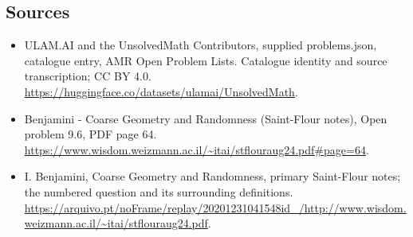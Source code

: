 \documentclass[11pt,a4paper]{article}
\begin{document}
\subsection{Sources}
\begin{itemize}
\item[S1] ULAM.AI and the UnsolvedMath Contributors, supplied problems.json, catalogue entry, AMR Open Problem Lists. Catalogue identity and source transcription; CC BY 4.0.
\url{https://huggingface.co/datasets/ulamai/UnsolvedMath}.
\item[S2] Benjamini - Coarse Geometry and Randomness (Saint-Flour notes), Open problem 9.6, PDF page 64. 
\url{https://www.wisdom.weizmann.ac.il/~itai/stflouraug24.pdf#page=64}.
\item[S3] I. Benjamini, Coarse Geometry and Randomness, primary Saint-Flour notes; the numbered question and its surrounding definitions.
\url{https://arquivo.pt/noFrame/replay/20201231041548id_/http://www.wisdom.weizmann.ac.il/~itai/stflouraug24.pdf}.
\end{itemize}
\end{document}
